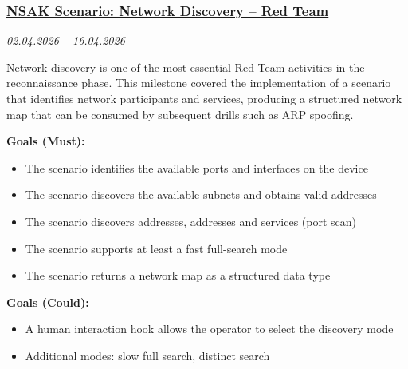 \subsubsection{\href{https://gitlab.ti.bfh.ch/groups/gausf1-vonal3/-/milestones/7}{NSAK Scenario: Network Discovery -- Red Team}}\label{subsubsec:milestone-network-discovery}
\textit{02.04.2026 -- 16.04.2026}

Network discovery is one of the most essential Red Team activities in the reconnaissance phase.
This milestone covered the implementation of a scenario that identifies network participants and services, producing a structured network map that can be consumed by subsequent drills such as \gls{ARP} spoofing.

\textbf{Goals (Must):}
\begin{itemize}
    \item[$\checkmark$] The scenario identifies the available ports and interfaces on the device
    \item[$\checkmark$] The scenario discovers the available subnets and obtains valid  addresses
    \item[$\checkmark$] The scenario discovers  addresses,  addresses and services (port scan)
    \item[$\checkmark$] The scenario supports at least a fast full-search mode
    \item[$\checkmark$] The scenario returns a network map as a structured data type
\end{itemize}

\textbf{Goals (Could):}
\begin{itemize}
    \item[$\square$] A human interaction hook allows the operator to select the discovery mode
    \item[$\square$] Additional modes: slow full search, distinct search
\end{itemize}
